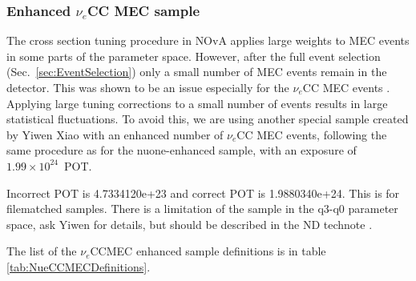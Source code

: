 \subsubsection*{Enhanced $\nu_e$CC MEC sample}
The cross section tuning procedure in \gls{NOvA} applies large weights to \gls{MEC} events in some parts of the parameter space. However, after the full event selection (Sec.~\ref{sec:EventSelection}) only a small number of \gls{MEC} events remain in the detector. This was shown to be an issue especially for the $\nu_e$\gls{CC} \gls{MEC} events \cite{NOVA-doc-56383}. Applying large tuning corrections to a small number of events results in large statistical fluctuations. To avoid this, we are using another special sample created by Yiwen Xiao \cite{NOVA-doc-56383} with an enhanced number of $\nu_e$\gls{CC} \gls{MEC} events, following the same procedure as for the \gls{nuone}-enhanced sample, with an exposure of $1.99\times10^{24}$~\gls{POT}.

Incorrect POT is 4.7334120e+23 and correct POT is 1.9880340e+24. This is for filematched samples. There is a limitation of the sample in the q3-q0 parameter space, ask Yiwen for details, but should be described in the ND technote \cite{NOVA-doc-56383}.

The list of the $\nu_e$\gls{CC}\gls{MEC} enhanced sample definitions is in table \ref{tab:NueCCMECDefinitions}.

